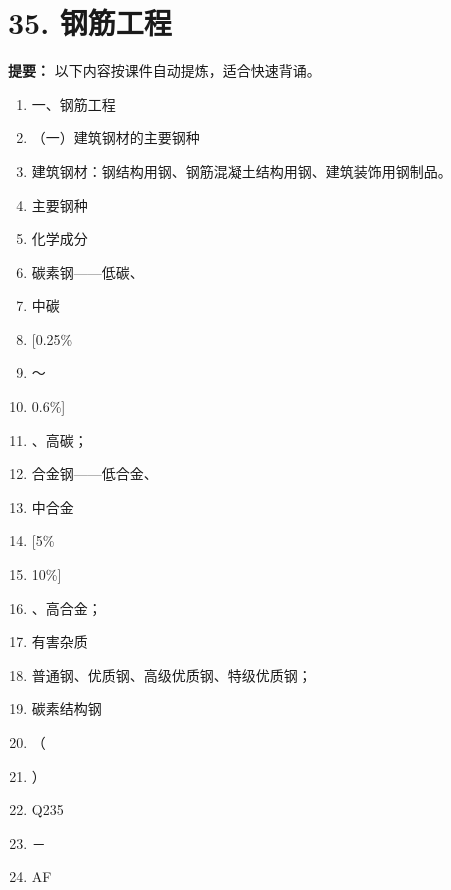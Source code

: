 \documentclass[UTF8,fontset=fandol,11pt]{ctexart}
\begin{document}
\newpage

\section*{35. 钢筋工程}


\begin{mainbox}

\textbf{提要：} 以下内容按课件自动提炼，适合快速背诵。

\end{mainbox}

\begin{enumerate}[label=\arabic*.]

\item 一、钢筋工程

\item （一）建筑钢材的主要钢种

\item 建筑钢材：钢结构用钢、钢筋混凝土结构用钢、建筑装饰用钢制品。

\item 主要钢种

\item 化学成分

\item 碳素钢——低碳、

\item 中碳

\item \relax{}[0.25\%

\item ～

\item 0.6\%]

\item 、高碳；

\item 合金钢——低合金、

\item 中合金

\item \relax{}[5\%

\item 10\%]

\item 、高合金；

\item 有害杂质

\item 普通钢、优质钢、高级优质钢、特级优质钢；

\item 碳素结构钢

\item （

\item ）

\item Q235

\item －

\item AF

\end{enumerate}
\end{document}
